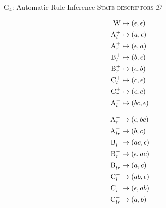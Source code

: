 \documentclass{beamer}
\newcommand\s{\textsc}
\newcommand\tsc[1]{\alert{\textsc{#1}}}
\begin{document}
  	\begin{frame}{G$_4$: Automatic Rule Inference}
  		\center \tsc{State descriptors $\mathcal{D}$}\\
	  	\begin{minipage}{.49\textwidth}
		\begin{align*}
		\s{W} &\mapsto (\epsilon, \epsilon) \\
		\s{A}^+_{l} &\mapsto (a, \epsilon) \\
		\s{A}^+_{r} &\mapsto (\epsilon, a) \\
		\s{B}^+_{l} &\mapsto (b, \epsilon) \\
		\s{B}^+_{r} &\mapsto (\epsilon, b) \\
		\s{C}^+_{l} &\mapsto (c, \epsilon) \\
		\s{C}^+_{r} &\mapsto (\epsilon, c) \\
		\s{A}^-_{l} &\mapsto (bc, \epsilon)
		\end{align*}
		\end{minipage}
		\begin{minipage}{.49\textwidth}
		\begin{align*}
		\s{A}^-_{r} &\mapsto (\epsilon, bc) \\
		\s{A}^-_{lr} &\mapsto (b, c) \\
		\s{B}^-_{l} &\mapsto (ac, \epsilon) \\
		\s{B}^-_{r} &\mapsto (\epsilon, ac) \\
		\s{B}^-_{lr} &\mapsto (a, c) \\
		\s{C}^-_{l} &\mapsto (ab, \epsilon) \\
		\s{C}^-_{r} &\mapsto (\epsilon, ab) \\
		\s{C}^-_{lr} &\mapsto (a, b)
		\end{align*}
		\end{minipage}
  	\end{frame}
\end{document}
